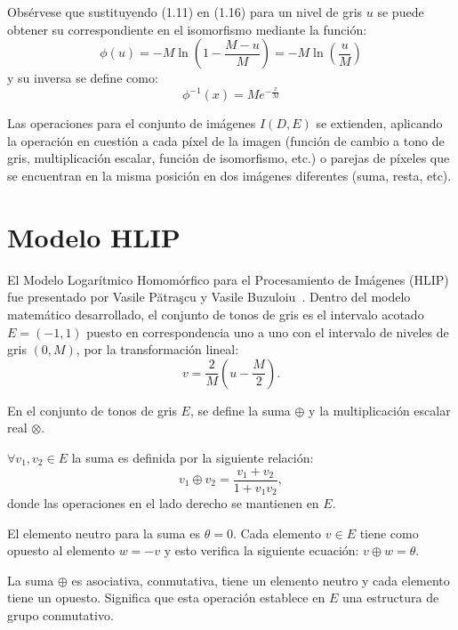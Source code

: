 Obs\'ervese que sustituyendo (1.11) en (1.16) para un nivel de gris $u$ se puede obtener su correspondiente en el isomorfismo mediante la funci\'on:
\begin{equation}
	\phi(u) = -M\ln\left(1-\frac{M-u}{M}\right) = -M\ln\left(\frac{u}{M}\right)
\end{equation}
y su inversa se define como:
\begin{equation}
	\phi^{-1}(x) = Me^{-\frac{x}{M}} 
\end{equation}

Las operaciones para el conjunto de im\'agenes $I(D,E)$ se extienden, aplicando la operaci\'on en cuesti\'on a cada p\'ixel de la imagen (funci\'on de cambio a tono de gris, multiplicaci\'on escalar, funci\'on de isomorfismo, etc.) o parejas de p\'ixeles que se encuentran en la misma posici\'on en dos im\'agenes diferentes (suma, resta, etc). 

\section{Modelo HLIP}

El Modelo Logar\'itmico Homom\'orfico para el Procesamiento de Im\'agenes (HLIP) fue presentado por Vasile Pătraşcu y Vasile Buzuloiu~\cite{patrascu2014mathematical}. Dentro del modelo matemático desarrollado, el conjunto de tonos de gris es el intervalo acotado $E = (-1, 1)$ puesto en correspondencia uno a uno con el intervalo de niveles de gris $(0,M)$, por la transformaci\'on lineal:
\begin{equation}
	v=\frac{2}{M}\left(u-\frac{M}{2}\right).
\end{equation}

En el conjunto de tonos de gris $E$, se define la suma $\oplus$ y la multiplicación escalar real $\otimes$.

$\forall v_1,v_2 \in E$ la suma es definida por la siguiente relaci\'on:
\begin{equation}
	v_1 \oplus v_2=\frac{v_1+v_2}{1+v_1v_2},
\end{equation}
donde las operaciones en el lado derecho se mantienen en $E$.

El elemento neutro para la suma es $\theta = 0$. Cada elemento $v \in E$ tiene como opuesto al elemento $w = - v$ y esto verifica la siguiente ecuación: $v \oplus w = \theta$.

La suma $\oplus$ es asociativa, conmutativa, tiene un elemento neutro y cada elemento tiene un opuesto. Significa que esta operación establece en $E$ una estructura de grupo conmutativo.

